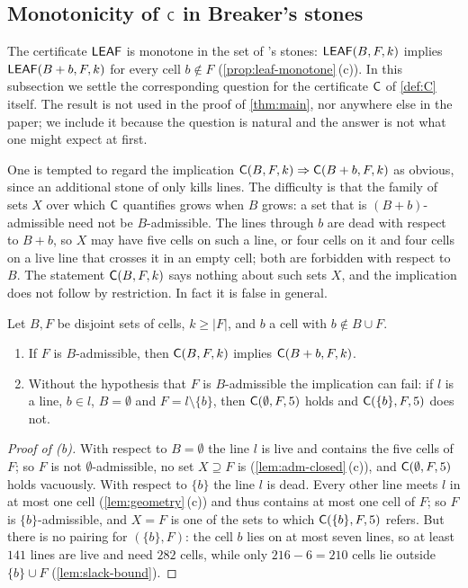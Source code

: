 
\subsection{Monotonicity of \texorpdfstring{$\CC$}{C} in Breaker's stones}\label{sec:extra-monoC}

The certificate $\mathsf{LEAF}$ is monotone in the set of \Breaker's stones: $\mathsf{LEAF}(B,F,k)$ implies
$\mathsf{LEAF}(B+b,F,k)$ for every cell $b\notin F$ (\cref{prop:leaf-monotone}\,(c)). In this subsection we settle
the corresponding question for the certificate $\CC$ of \cref{def:C} itself. The result is not used in
the proof of \cref{thm:main}, nor anywhere else in the paper; we include it because the question is
natural and the answer is not what one might expect at first.

One is tempted to regard the implication $\mathsf{C}(B,F,k)\Rightarrow\mathsf{C}(B+b,F,k)$ as obvious, since an
additional stone of \Breaker{} only kills lines. The difficulty is that the family of sets $X$ over
which $\CC$ quantifies grows when $B$ grows: a set that is $(B+b)$-admissible need not be $B$-admissible.
The lines through $b$ are dead with respect to $B+b$, so $X$ may have five cells on such a line, or four
cells on it and four cells on a live line that crosses it in an empty cell; both are forbidden with
respect to $B$. The statement $\mathsf{C}(B,F,k)$ says nothing about such sets $X$, and the implication does
not follow by restriction. In fact it is false in general.

\begin{proposition}[Monotonicity of $\CC$ in $B$]\label{prop:C-monotone}
Let $B,F$ be disjoint sets of cells, $k\ge|F|$, and $b$ a cell with $b\notin B\cup F$.
\begin{enumerate}[label=\textup{(\alph*)}]
\item If $F$ is $B$-admissible, then $\mathsf{C}(B,F,k)$ implies $\mathsf{C}(B+b,F,k)$.
\item Without the hypothesis that $F$ is $B$-admissible the implication can fail: if $l$ is a line,
      $b\in l$, $B=\emptyset$ and $F=l\setminus\{b\}$, then $\mathsf{C}(\emptyset,F,5)$ holds and
      $\mathsf{C}(\{b\},F,5)$ does not.
\end{enumerate}
\end{proposition}

\begin{proof}[Proof of \textup{(b)}]
With respect to $B=\emptyset$ the line $l$ is live and contains the five cells of $F$; so $F$ is not
$\emptyset$-admissible, no set $X\supseteq F$ is (\cref{lem:adm-closed}\,(c)), and $\mathsf{C}(\emptyset,F,5)$ holds
vacuously. With respect to $\{b\}$ the line $l$ is dead. Every other line meets $l$ in at most one cell
(\cref{lem:geometry}\,(c)) and thus contains at most one cell of $F$; so $F$ is $\{b\}$-admissible, and
$X=F$ is one of the sets to which $\mathsf{C}(\{b\},F,5)$ refers. But there is no pairing for $(\{b\},F)$: the cell
$b$ lies on at most seven lines, so at least $141$ lines are live and need $282$ cells, while only
$216-6=210$ cells lie outside $\{b\}\cup F$ (\cref{lem:slack-bound}).
\end{proof}

